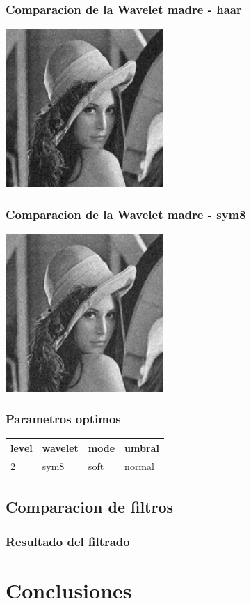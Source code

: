 \documentclass{beamer}
\begin{document}
  \begin{frame}
    \frametitle{Comparacion de la Wavelet madre - haar}
    
    \centering
    
    \includegraphics[width=6cm]{imgs/Wavelets/2_normal_soft_haar_Lenna.jpg}
    

  
  \end{frame}

  \begin{frame}
    \frametitle{Comparacion de la Wavelet madre - sym8}
    
    \centering
    
    
    \includegraphics[width=6cm]{imgs/Wavelets/2_normal_soft_sym8_Lenna.jpg}

  
  \end{frame}

  \begin{frame}
    \frametitle{Parametros optimos}
    \centering
    \begin{tabular}{llll}
      \toprule
      level & wavelet & mode & umbral \\
      \midrule 
      2 & sym8 & soft & normal \\
      \bottomrule
    \end{tabular}
  
  \end{frame}

  \subsection{Comparacion de filtros}

  \begin{frame}
    \frametitle{Resultado del filtrado}
  
    
  
  \end{frame}

  \section{Conclusiones}
\end{document}
